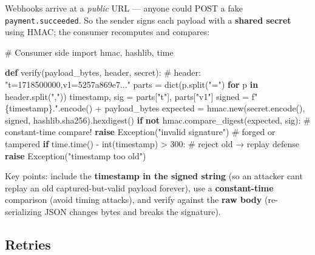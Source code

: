 \documentclass[11pt]{article}
\newenvironment{Shaded}{\begin{snugshade}}{\end{snugshade}}
\newcommand{\BuiltInTok}[1]{\textcolor[rgb]{0.50,0.55,0.55}{#1}}
\newcommand{\CommentTok}[1]{\textcolor[rgb]{0.48,0.49,0.49}{#1}}
\newcommand{\ControlFlowTok}[1]{\textcolor[rgb]{0.99,0.74,0.29}{\textbf{#1}}}
\newcommand{\DecValTok}[1]{\textcolor[rgb]{0.96,0.45,0.00}{#1}}
\newcommand{\ImportTok}[1]{\textcolor[rgb]{0.15,0.68,0.38}{#1}}
\newcommand{\KeywordTok}[1]{\textcolor[rgb]{0.81,0.81,0.76}{\textbf{#1}}}
\newcommand{\NormalTok}[1]{\textcolor[rgb]{0.81,0.81,0.76}{#1}}
\newcommand{\OperatorTok}[1]{\textcolor[rgb]{0.81,0.81,0.76}{#1}}
\newcommand{\PreprocessorTok}[1]{\textcolor[rgb]{0.15,0.68,0.38}{#1}}
\newcommand{\SpecialCharTok}[1]{\textcolor[rgb]{0.24,0.68,0.91}{#1}}
\newcommand{\SpecialStringTok}[1]{\textcolor[rgb]{0.85,0.27,0.33}{#1}}
\newcommand{\StringTok}[1]{\textcolor[rgb]{0.96,0.31,0.31}{#1}}
\begin{document}
Webhooks arrive at a \emph{public} URL --- anyone could POST a fake \texttt{payment.succeeded}. So the sender signs each payload with a \textbf{shared secret} using HMAC; the consumer recomputes and compares:


\begin{Shaded}
\begin{Highlighting}[]
\CommentTok{\# Consumer side}
\ImportTok{import}\NormalTok{ hmac, hashlib, time}

\KeywordTok{def}\NormalTok{ verify(payload\_bytes, header, secret):}
    \CommentTok{\# header: "t=1718500000,v1=5257a869e7..."}
\NormalTok{    parts }\OperatorTok{=} \BuiltInTok{dict}\NormalTok{(p.split(}\StringTok{"="}\NormalTok{) }\ControlFlowTok{for}\NormalTok{ p }\KeywordTok{in}\NormalTok{ header.split(}\StringTok{","}\NormalTok{))}
\NormalTok{    timestamp, sig }\OperatorTok{=}\NormalTok{ parts[}\StringTok{"t"}\NormalTok{], parts[}\StringTok{"v1"}\NormalTok{]}
\NormalTok{    signed }\OperatorTok{=} \SpecialStringTok{f"}\SpecialCharTok{\{}\NormalTok{timestamp}\SpecialCharTok{\}}\SpecialStringTok{."}\NormalTok{.encode() }\OperatorTok{+}\NormalTok{ payload\_bytes}
\NormalTok{    expected }\OperatorTok{=}\NormalTok{ hmac.new(secret.encode(), signed, hashlib.sha256).hexdigest()}
    \ControlFlowTok{if} \KeywordTok{not}\NormalTok{ hmac.compare\_digest(expected, sig):     }\CommentTok{\# constant{-}time compare!}
        \ControlFlowTok{raise} \PreprocessorTok{Exception}\NormalTok{(}\StringTok{"invalid signature"}\NormalTok{)        }\CommentTok{\# forged or tampered}
    \ControlFlowTok{if}\NormalTok{ time.time() }\OperatorTok{{-}} \BuiltInTok{int}\NormalTok{(timestamp) }\OperatorTok{\textgreater{}} \DecValTok{300}\NormalTok{:          }\CommentTok{\# reject old → replay defense}
        \ControlFlowTok{raise} \PreprocessorTok{Exception}\NormalTok{(}\StringTok{"timestamp too old"}\NormalTok{)}
\end{Highlighting}
\end{Shaded}

Key points: include the \textbf{timestamp in the signed string} (so an attacker can\textquotesingle t replay an old captured-but-valid payload forever), use a \textbf{constant-time} comparison (avoid timing attacks), and verify against the \textbf{raw body} (re-serializing JSON changes bytes and breaks the signature).

\subsection{Retries}\label{retries}
\end{document}
